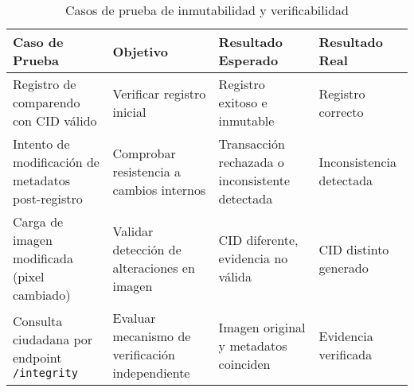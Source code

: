 \begin{table}[htbp]
\centering
\small
\begin{tabular}{|>{\raggedright\arraybackslash}p{4.5cm}|>{\raggedright\arraybackslash}p{3.2cm}|>{\raggedright\arraybackslash}p{3.2cm}|>{\raggedright\arraybackslash}p{2.2cm}|}
\hline
\textbf{Caso de Prueba} & \textbf{Objetivo} & \textbf{Resultado Esperado} & \textbf{Resultado Real} \\
\hline
Registro de comparendo con CID válido & Verificar registro inicial & Registro exitoso e inmutable & Registro correcto \\
\hline
Intento de modificación de metadatos post-registro & Comprobar resistencia a cambios internos & Transacción rechazada o inconsistente detectada & Inconsistencia detectada \\
\hline
Carga de imagen modificada (pixel cambiado) & Validar detección de alteraciones en imagen & CID diferente, evidencia no válida & CID distinto generado \\
\hline
Consulta ciudadana por endpoint \texttt{/integrity} & Evaluar mecanismo de verificación independiente & Imagen original y metadatos coinciden & Evidencia verificada \\
\hline
\end{tabular}
\caption{Casos de prueba de inmutabilidad y verificabilidad}
\end{table} 
